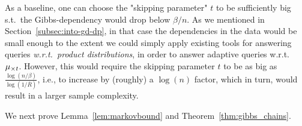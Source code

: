 \documentclass[12pt,a4paper,oneside,onecolumn]{book}
\begin{document}
\begin{remark}
As a baseline, one can choose the "skipping parameter" $t$ to be sufficiently big s.t.\ the Gibbs-dependency would drop below $\beta/n$. 
As we mentioned in Section~\ref{subsec:into-gd-dp},
in that case the dependencies in the data would be small enough to the extent we could simply apply existing tools for answering queries {\em w.r.t.\ product distributions}, in order to answer adaptive queries w.r.t.\ $\mu_{\times t}$. However, this would require the skipping parameter $t$ to be as big as 
$\frac{\log(n/\beta)}{\log(1/\bar{R})}$, i.e., to increase by (roughly) a $\log(n)$ factor, which in turn, would result in a larger sample complexity.
\end{remark}



We next prove Lemma~\ref{lem:markovbound} and Theorem~\ref{thm:gibbs_chains}.
\end{document}
